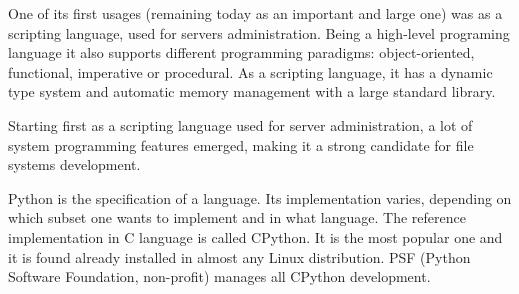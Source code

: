     One of its first usages (remaining today as an important and large one) was as a scripting language, used for servers administration. Being a high-level programing language it also supports different programming paradigms: object-oriented, functional, imperative or procedural. As a scripting language, it has a dynamic type system and automatic memory management with a large standard library.
    
    Starting first as a scripting language used for server administration, a lot of system programming features emerged, making it a strong candidate for file systems development.
    
    Python is the specification of a language. Its implementation varies, depending on which subset one wants to implement and in what language. The reference implementation in C language is called CPython. It is the most popular one and it is found already installed in almost any Linux distribution. PSF (Python Software Foundation, non-profit) manages all CPython development.
    
